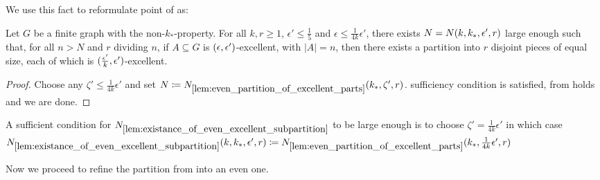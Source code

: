         We use this fact to reformulate point  of
         as:

        \begin{lemma} \label{lem:existance_of_even_excellent_subpartition}
            Let $G$ be a finite graph with the non-$k_*$-property.
            For all $k, r \geq 1$, $\epsilon' \leq \frac{1}{5}$ and $\epsilon \leq \frac{1}{4k} \epsilon'$, there exists
            $N = N( k, k_*, \epsilon', r )$ large enough such that, for all $n > N$ and $r$ dividing $n$,
            if $A \subseteq G$ is $( \epsilon, \epsilon' )$-excellent, with $|A| = n$, then there exists a
            partition into $r$ disjoint pieces of equal size, each of which is $( \frac{\epsilon'}{k}, \epsilon' )$-excellent.
            \begin{proof}
                Choose any $\zeta' \leq \frac{1}{4k} \epsilon'$ and set
                $N \coloneqq N_{\ref{lem:even_partition_of_excellent_parts}}( k_*, \zeta', r )$.
                 sufficiency condition is satisfied,
                 from 
                holds and we are done.
            \end{proof}
        \end{lemma}

        \begin{remark}
            A sufficient condition for $N_{\ref{lem:existance_of_even_excellent_subpartition}}$ to be large enough is
            to choose $\zeta' = \frac{1}{4k} \epsilon'$ in which case
            $N_{\ref{lem:existance_of_even_excellent_subpartition}}( k, k_*, \epsilon', r ) \coloneqq
            N_{\ref{lem:even_partition_of_excellent_parts}}( k_*, \frac{1}{4k} \epsilon', r )$
        \end{remark}

        Now we proceed to refine the partition from  into an even one.

